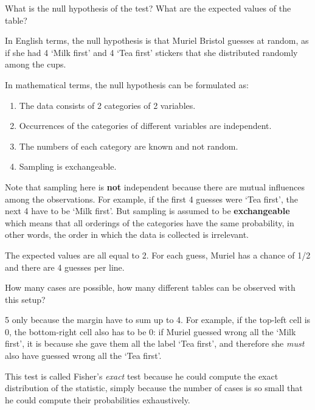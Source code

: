 \documentclass[a4paper]{article}
\theoremstyle{definition}
\begin{document}
\begin{Exercise}
What is the null hypothesis of the test? What are the expected values
of the table?
\end{Exercise}
\begin{Answer}
In English terms, the null hypothesis is that Muriel Bristol guesses
at random, as if she had 4 `Milk first' and 4 `Tea first' stickers
that she distributed randomly among the cups.

In mathematical terms, the null hypothesis can be formulated as:
\begin{enumerate}
\item
The data consists of 2 categories of 2 variables.
\item
\label{reject}
Occurrences of the categories of different variables are independent.
\item
The numbers of each category are known and not random.
\item
Sampling is exchangeable.
\end{enumerate}
Note that sampling here is \textbf{not} independent because there are
mutual influences among the observations. For example, if the first
4 guesses were `Tea first', the next 4 have to be `Milk first'.
But sampling is assumed to be \textbf{exchangeable} which means that
all orderings of the categories have the same probability, in other
words, the order in which the data is collected is irrelevant.

The expected values are all equal to 2. For each guess, Muriel has
a chance of 1/2 and there are 4 guesses per line.
\end{Answer}

\begin{Exercise}
How many cases are possible, how many different tables can be
observed with this setup?
\end{Exercise}
\begin{Answer}
5 only because the margin have to sum up to 4. For example, if the
top-left cell is 0, the bottom-right cell also has to be 0: if Muriel
guessed wrong all the `Milk first', it is because she gave them
all the label `Tea first', and therefore she \emph{must} also have
guessed wrong all the `Tea first'.

This test is called Fisher's \emph{exact} test because he could
compute the exact distribution of the statistic, simply because
the number of cases is so small that he could compute their probabilities
exhaustively.
\end{Answer}
\end{document}
